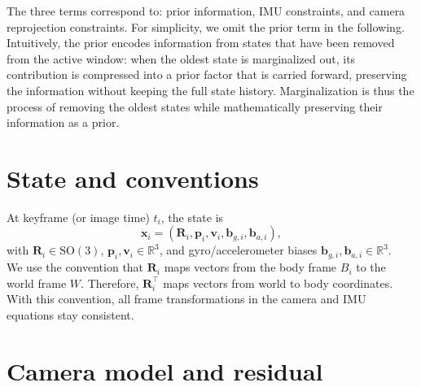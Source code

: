 \documentclass[11pt]{article}
\newcommand{\R}{\mathbb{R}}
\newcommand{\SO}{\mathrm{SO}(3)}
\newcommand{\T}{^{\top}}
\begin{document}
The three terms correspond to: prior information, IMU constraints, and camera reprojection constraints. 
For simplicity, we omit the prior term in the following. 
\\
Intuitively, the prior encodes information from states that 
have been removed from the active window: when the oldest state is marginalized out, its contribution is compressed into 
a prior factor that is carried forward, preserving the information without keeping the full state history. Marginalization 
is thus the process of removing the oldest states while mathematically preserving their information as a prior.

\section{State and conventions}

At keyframe (or image time) \(t_i\), the state is
\begin{equation}
\mathbf{x}_i = (\mathbf{R}_i,\mathbf{p}_i,\mathbf{v}_i,\mathbf{b}_{g,i},\mathbf{b}_{a,i}),
\end{equation}
with
\(\mathbf{R}_i\in \SO\), \(\mathbf{p}_i,\mathbf{v}_i\in\R^3\), and gyro/accelerometer biases
\(\mathbf{b}_{g,i},\mathbf{b}_{a,i}\in\R^3\).
\\
We use the convention that \(\mathbf{R}_i\) maps vectors from the body frame \(B_i\) to the world frame \(W\).
Therefore, \(\mathbf{R}_i\T\) maps vectors from world to body coordinates.
\\
With this convention, all frame transformations in the camera and IMU equations stay consistent.

\section{Camera model and residual}
\end{document}
